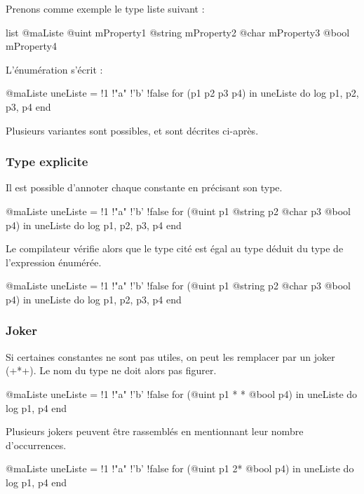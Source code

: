 Prenons comme exemple le type liste suivant :
\begin{galgas}
list @maListe {
  @uint mProperty1
  @string mProperty2
  @char mProperty3
  @bool mProperty4
}
\end{galgas}

L'énumération s'écrit :
\begin{galgas}
@maListe uneListe = {!1 !"a" !'b' !false}
for (p1 p2 p3 p4) in uneListe do
  log p1, p2, p3, p4
end
\end{galgas}

Plusieurs variantes sont possibles, et sont décrites ci-après.

\subsubsection{Type explicite}

Il est possible d'annoter chaque constante en précisant son type.

\begin{galgas}
@maListe uneListe = {!1 !"a" !'b' !false}
for (@uint p1 @string p2 @char p3 @bool p4) in uneListe do
  log p1, p2, p3, p4
end
\end{galgas}

Le compilateur vérifie alors que le type cité est égal au type déduit du type de l'expression énumérée.
\begin{galgas}
@maListe uneListe = {!1 !"a" !'b' !false}
for (@uint p1 @string p2 @char p3 @bool p4) in uneListe do
  log p1, p2, p3, p4
end
\end{galgas}


\subsubsection{Joker}

Si certaines constantes ne sont pas utiles, on peut les remplacer par un joker (\ggs+*+). Le nom du type ne doit alors pas figurer.
\begin{galgas}
@maListe uneListe = {!1 !"a" !'b' !false}
for (@uint p1 * * @bool p4) in uneListe do
  log p1, p4
end
\end{galgas}

Plusieurs jokers peuvent être rassemblés en mentionnant leur nombre d'occurrences.
\begin{galgas}
@maListe uneListe = {!1 !"a" !'b' !false}
for (@uint p1 2* @bool p4) in uneListe do
  log p1, p4
end
\end{galgas}



